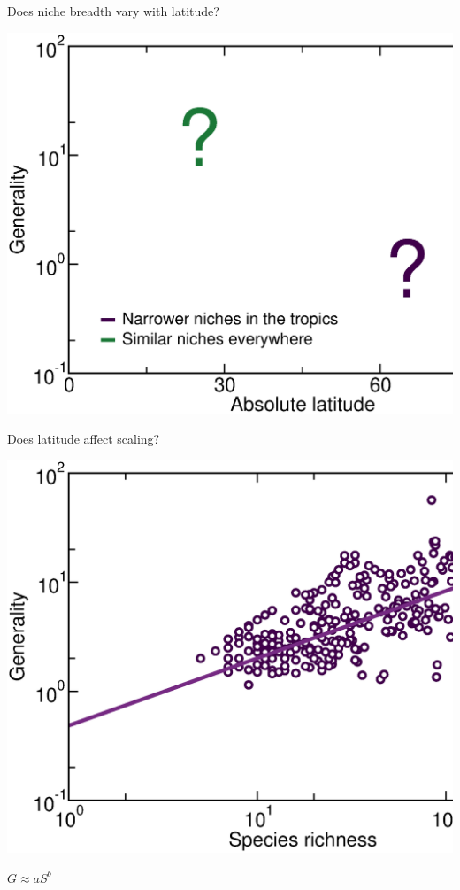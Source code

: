 \documentclass{beamer}
\begin{document}
 \begin{frame}{Does niche breadth vary with latitude?}

    \begin{center}
      \includegraphics*[width=.654\textwidth]{Figures/results/Gen_vs_lat_negative.eps}

    \vspace{.3cm}
      {\color{white}{\Large      
      $G \approx aS^b$}}
    \end{center}

  \end{frame}


  \begin{frame}{Does latitude affect scaling?}

    \begin{center}
      \includegraphics*[width=.654\textwidth]{Figures/results/Gen_dots_vs_S_fitline_observed.eps}

    \vspace{.3cm}
      {\Large      
      $G \approx aS^b$}
    \end{center}
  \end{frame}
\end{document}
